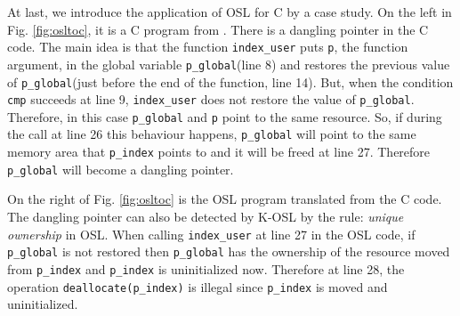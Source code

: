 \documentclass[runningheads]{llncs}
\def\codec#1{\texttt{#1}}
\begin{document}

At last, we introduce the application of OSL for C by a case study.
On the left in Fig. \ref{fig:osltoc}, it is a C program from \cite{DBLP:journals/virology/FeistMP14}.
There is a dangling pointer in the C code.
The main idea is that the function \codec{index\_user} puts \codec{p}, the 
function argument, in the global variable \codec{p\_global}(line 8) and restores the previous value of \codec{p\_global}(just before the end of the function, line 14). But, when the condition \codec{cmp} succeeds at line 9, \codec{index\_user} does not restore the value of \codec{p\_global}.  Therefore, in this case \codec{p\_global} and \codec{p} point to the same resource.
So, if during the call at line 26 this behaviour happens, \codec{p\_global} will point to the same memory area that \codec{p\_index} points to and it will be freed at line 27. Therefore \codec{p\_global} will become a dangling pointer. 

On the right of Fig. \ref{fig:osltoc} is the OSL program translated from the C code.
The dangling pointer can also be detected by K-OSL by the rule: \emph{unique ownership} in OSL.
When calling \codec{index\_user} at line 27 in the OSL code, if \codec{p\_global} is not restored then
\codec{p\_global} has the ownership of the resource moved from \codec{p\_index} and \codec{p\_index} is uninitialized now.
Therefore at line 28, the operation \codec{deallocate(p\_index)} is illegal since \codec{p\_index} is moved and uninitialized.
\end{document}
